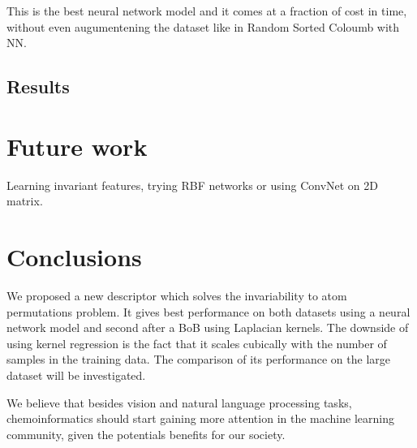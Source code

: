 \documentclass{article}
\begin{document}
This is the best neural network model and it comes at a fraction of cost in time, without even augumentening the dataset like in Random Sorted Coloumb with NN.

\subsection{Results}

\section{Future work}
Learning invariant features, trying RBF networks or using ConvNet on 2D matrix.

\section{Conclusions}
We proposed a new descriptor which solves the invariability to atom permutations problem. It gives best performance on both datasets using a neural network model and second after a BoB using Laplacian kernels. The downside of using kernel regression is the fact that it scales cubically with the number of samples in the training data. 
The comparison of its performance on the large dataset will be investigated.

We believe that besides vision and natural language processing tasks, chemoinformatics  should start gaining more attention  in the machine learning community, given the potentials benefits for our society.





\end{document}
